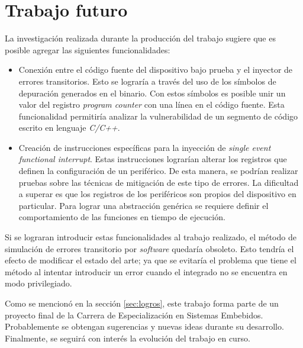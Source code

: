 \newpage

\section{Trabajo futuro}
\label{sec:futuro}

La investigación realizada durante la producción del trabajo sugiere que es posible agregar las siguientes funcionalidades:

\begin{itemize}
    \item Conexión entre el código fuente del dispositivo bajo prueba y el inyector de errores transitorios.
        Esto se lograría a través del uso de los símbolos de depuración generados en el binario.
        Con estos símbolos es posible unir un valor del registro \emph{program counter} con una línea en el código fuente.
        Esta funcionalidad permitiría analizar la vulnerabilidad de un segmento de código escrito en lenguaje \emph{C/C++}.
    \item Creación de instrucciones específicas para la inyección de \emph{single event functional interrupt}.
        Estas instrucciones lograrían alterar los registros que definen la configuración de un periférico.
        De esta manera, se podrían realizar pruebas sobre las técnicas de mitigación de este tipo de errores.
        La dificultad a superar es que los registros de los periféricos son propios del dispositivo en particular.
        Para lograr una abstracción genérica se requiere definir el comportamiento de las funciones en tiempo de ejecución.
\end{itemize}

Si se lograran introducir estas funcionalidades al trabajo realizado, el método de simulación de errores transitorio por \emph{software} quedaría obsoleto.
Esto tendría el efecto de modificar el estado del arte; ya que se evitaría el problema que tiene el método al intentar introducir un error cuando el integrado no se encuentra en modo privilegiado.

Como se mencionó en la sección \ref{sec:logros}, este trabajo forma parte de un proyecto final de la Carrera de Especialización en Sistemas Embebidos.
Probablemente se obtengan sugerencias y nuevas ideas durante su desarrollo.
Finalmente, se seguirá con interés la evolución del trabajo en curso.

